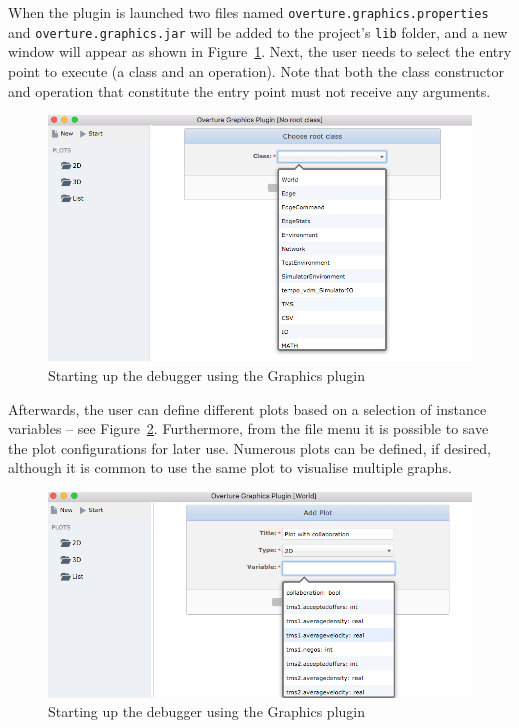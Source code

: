 \documentclass{overturerepchap}
\begin{document}
When the plugin is launched two files named
\texttt{overture.graphics.properties} and
\texttt{overture.graphics.jar} will be added to the project's
\texttt{lib} folder, and a new window will appear as shown in
Figure~\ref{fig:graphicselectclass}. Next, the user needs to select
the entry point to execute (a class and an operation). Note that both
the class constructor and operation that constitute the entry point
must not receive any arguments.

\begin{figure}[htbp]
\begin{center}
\includegraphics[width=\textwidth]{screenDumps/graphicselectclass}
\caption{Starting up the debugger using the Graphics plugin\label{fig:graphicselectclass}}
\end{center}
\end{figure}

Afterwards, the user can define different plots based on a selection
of instance variables -- see
Figure~\ref{fig:graphicsAddPlot}. Furthermore, from the file menu it
is possible to save the plot configurations for later use. Numerous
plots can be defined, if desired, although it is common to use the
same plot to visualise multiple graphs.

\begin{figure}[htbp]
\begin{center}
\includegraphics[width=\textwidth]{screenDumps/graphicsAddPlot}
\caption{Starting up the debugger using the Graphics plugin\label{fig:graphicsAddPlot}}
\end{center}
\end{figure}
\end{document}
